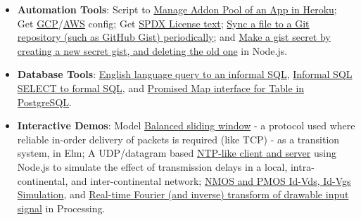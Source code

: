 \begin{itemize}[noitemsep, leftmargin=*]
  \item \textbf{Automation Tools}:
    Script to \href{https://github.com/nodef/heroku-addonpool}{Manage Addon Pool of an App in Heroku};
    Get \href{https://github.com/nodef/extra-gcpconfig}{GCP}/\href{https://github.com/nodef/extra-awsconfig}{AWS} config;
    Get \href{https://github.com/nodef/extra-license}{SPDX License text};
    \href{https://github.com/javascriptf/script-git-sync-file}{Sync a file to a Git repository (such as GitHub Gist) periodically}; and
    \href{https://github.com/javascriptf/script-gist-conceal}{Make a gist secret by creating a new secret gist, and deleting the old one} in Node.js.
  \item \textbf{Database Tools}:
    \href{https://github.com/nodef/pg-english}{English language query to an informal SQL},
    \href{https://github.com/nodef/pg-slang}{Informal SQL SELECT to formal SQL}, and
    \href{https://github.com/nodef/map-pg}{Promised Map interface for Table in PostgreSQL}.
  \item \textbf{Interactive Demos}: 
    Model \href{https://github.com/htmlf/balanced-sliding-window}{Balanced sliding window} - a protocol used where reliable in-order delivery of packets is required (like TCP) - as a transition system, in Elm;
    A UDP/datagram based \href{https://github.com/javascriptf/nodejs-time-server}{NTP-like client and server} using Node.js to simulate the effect of transmission delays in a local, intra-continental, and inter-continental network;
    \href{https://github.com/processingf/mosfet_sim}{NMOS and PMOS Id-Vds, Id-Vgs Simulation}, and
    \href{https://github.com/processingf/fourier_transform}{Real-time Fourier (and inverse) transform of drawable input signal} in Processing.
\end{itemize}

